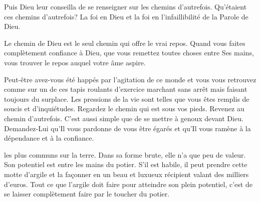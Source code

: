 Puis Dieu leur conseilla de
 \og se renseigner sur les chemins d'autrefois. \fg{}
 Qu'étaient ces chemins d'autrefois? La foi en Dieu et la foi
 en l'infaillibilité de la Parole de Dieu. 


Le chemin de Dieu est le seul chemin qui offre le vrai repos.
 Quand vous faites complètement confiance à Dieu,
 que vous remettez toutes choses entre Ses mains,
 vous trouver le repos auquel votre âme aspire. 

Peut-être avez-vous été happés par l'agitation de ce monde
 et vous vous retrouvez comme sur un de ces tapis roulants d'exercice
 \ocadr marchant sans arrêt mais faisant toujours du surplace.
 Les pressions de la vie sont telles que vous êtes remplis de soucis
 et d'inquiétudes. Regardez le chemin qui est sous vos pieds.
 Revenez au chemin d'autrefois. C'est aussi simple que de se mettre
 à genoux devant Dieu. Demandez-Lui qu'Il vous pardonne de vous
 être égarés et qu'Il vous ramène à la dépendance et à la confiance. 


\dvrule






 les plus communs sur la terre.
 Dans sa forme brute, elle n'a que peu de valeur.
 Son potentiel est entre les mains du potier.
 S'il est habile, il peut prendre cette motte d'argile et la façonner
 en un beau et luxueux récipient valant des milliers d'euros.
 Tout ce que l'argile doit faire pour atteindre son plein potentiel,
 c'est de se laisser complètement faire par le toucher du potier. 

